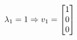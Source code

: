 \documentclass[preview]{standalone}
\begin{document}
\begin{align*}
\special{dvisvgm:raw <g id='unique000'>}\lambda_1 = 1 \Rightarrow v_1 = \begin{bmatrix} 1 \\ 0 \\ 0 \end{bmatrix}\special{dvisvgm:raw </g>}
\end{align*}
\end{document}
